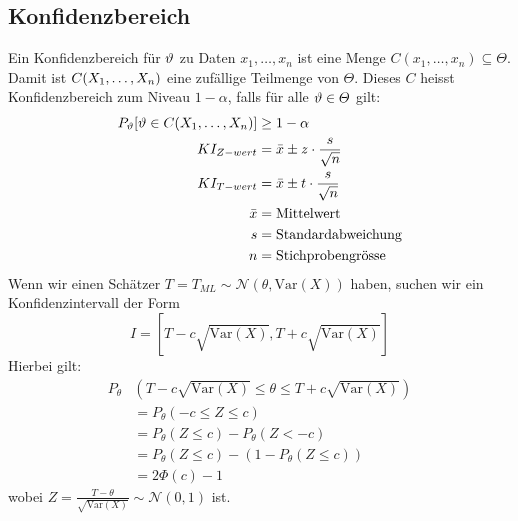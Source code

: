 \subsection{Konfidenzbereich}
Ein Konfidenzbereich für $\vartheta$ zu Daten $x_1, \dots, x_n$ ist eine Menge $C
  (x_1, \dots, x_n) \subseteq \varTheta$. Damit ist $C (X_1, \dots, X_n)$ eine
zufällige Teilmenge von $\varTheta$. Dieses $C$ heisst Konfidenzbereich zum
Niveau $1 - \alpha$, falls für alle $\vartheta \in \varTheta$ gilt:
\begin{align*}
  P_\vartheta [\vartheta \in C (X_1, \dots, X_n)] & \geq 1 - \alpha                          \\
  KI_{Z-wert}                           & = \bar{x} \pm z \cdot \frac{s}{\sqrt{n}} \\
  KI_{T-wert}                           & = \bar{x} \pm t \cdot \frac{s}{\sqrt{n}} \\
  \bar{x}                               & = \text{Mittelwert}                      \\
  s                                     & = \text{Standardabweichung}              \\
  n                                     & = \text{Stichprobengrösse}               \\
\end{align*}
Wenn wir einen Schätzer \(T = T_{ML} \sim \mathcal{N}\left(\theta, \text{Var}(X)\right)\) haben, suchen wir ein Konfidenzintervall der Form
\[I = \left[T-c \sqrt{\text{Var}(X)}, T+c\sqrt{\text{Var}(X)}\right]\]
Hierbei gilt:
\begin{align*}
    P_\theta&\left(T-c\sqrt{\text{Var}(X)} \le \theta \le T+c\sqrt{\text{Var}(X)}\right) \\
    &= P_\theta\left(-c\le Z \le c\right)\\
    &= P_{\theta}\left(Z \leq c\right) - P_{\theta}\left(Z < -c\right)\\
    &= P_{\theta}\left(Z \leq c\right) - \left(1-P_{\theta}\left(Z \leq c\right)\right)\\
    &= 2\Phi(c)-1
\end{align*}
wobei \(Z = \frac{T-\theta}{\sqrt{\text{Var}(X)}} \sim \mathcal{N}(0,1)\) ist.

\BoxStart{}
